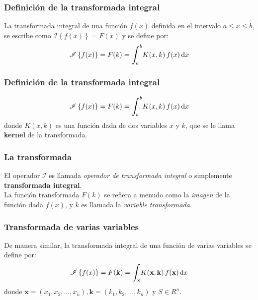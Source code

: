 \documentclass[12pt]{beamer}
\begin{document}
\begin{frame}
\frametitle{Definición de la transformada integral}
La transformada integral de una función $f (x)$ definida en el intervalo $a \leq x \leq b$, se escribe como $\mathscr{I} \left\{ f (x) \right\} = F (x)$ y se define por:
\pause
\begin{align}
\mathscr{I} \left\{ f (x) \right\} = F (k) = \scaleint{6ex}_{\bs a}^{b} K (x, k) \, f (x) \dd{x}
\label{eq:ecuacion_01_02_01}
\end{align}
\end{frame}
\begin{frame}
\frametitle{Definición de la transformada integral}
\begin{align*}
\mathscr{I} \left\{ f (x) \right\} = F (k) = \scaleint{6ex}_{\bs a}^{b} K (x, k) \, f (x) \dd{x}
\end{align*}
donde $K (x, k)$ es una función dada de dos variables $x$ y $k$, que se le llama \textbf{\textcolor{blue(pigment)}{kernel}} de la transformada.
\end{frame}
\begin{frame}
\frametitle{La transformada}
El operador $\mathscr{I}$ es llamada \emph{operador de transformada integral} o simplemente \textbf{\textcolor{brickred}{transformada integral}}.
\\
\bigskip
\pause
La función transformada $F (k)$ se refiera a menudo como la \emph{imagen} de la función dada $f (x)$, y $k$ es llamada la \emph{variable transformada}.
\end{frame}
\begin{frame}
\frametitle{Transformada de varias variables}
De manera similar, la transformada integral de una función de varias variables se define por:
\pause
\begin{align}
\mathscr{I} \left\{ f (x) \right\} = F(\mathbf{k}) = \scaleint{6ex}_{\bs S} K (\mathbf{x}, \mathbf{k}) \, f (\mathbf{x}) \dd{x}
\label{eq:ecuacion_01_02_02}
\end{align}
donde $\mathbf{x} = (x_{1}, x_{2}, \ldots, x_{n}), \mathbf{k} = (k_{1}, k_{2}, \ldots, k_{n})$ y $S \in R^{n}$.
\end{frame}
\end{document}
